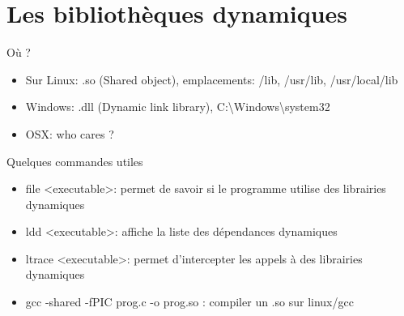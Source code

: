 \section{Les bibliothèques dynamiques}


\begin{frame}{Où ?}
	\begin{itemize}
		\item Sur Linux: .so (Shared object), emplacements: /lib, /usr/lib, /usr/local/lib
		\item Windows: .dll (Dynamic link library), C:\textbackslash Windows\textbackslash system32
		\item OSX: who cares ?
	\end{itemize}
\end{frame}

\begin{frame}{Quelques commandes utiles}
	\begin{itemize}
	    \item file <executable>: permet de savoir si le programme utilise des librairies dynamiques
		\item ldd <executable>: affiche la liste des dépendances dynamiques
		\item ltrace <executable>: permet d'intercepter les appels à des librairies dynamiques
		\item gcc -shared -fPIC prog.c -o prog.so  : compiler un .so sur linux/gcc
	\end{itemize}
\end{frame}

